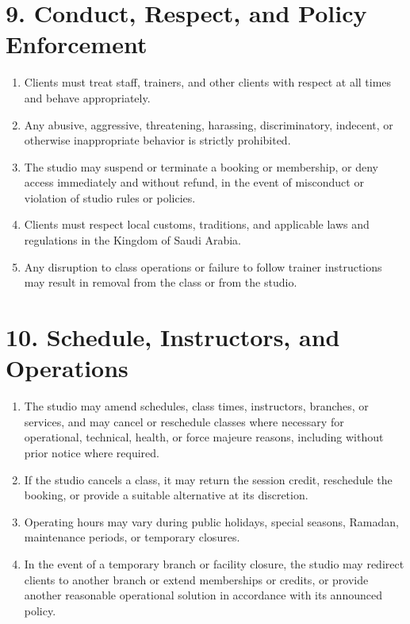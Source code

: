 \documentclass[12pt,a4paper]{article}
\begin{document}
\section*{9. Conduct, Respect, and Policy Enforcement}
\begin{enumerate}
    \item Clients must treat staff, trainers, and other clients with respect at all times and behave appropriately.
    \item Any abusive, aggressive, threatening, harassing, discriminatory, indecent, or otherwise inappropriate behavior is strictly prohibited.
    \item The studio may suspend or terminate a booking or membership, or deny access immediately and without refund, in the event of misconduct or violation of studio rules or policies.
    \item Clients must respect local customs, traditions, and applicable laws and regulations in the Kingdom of Saudi Arabia.
    \item Any disruption to class operations or failure to follow trainer instructions may result in removal from the class or from the studio.
\end{enumerate}

\section*{10. Schedule, Instructors, and Operations}
\begin{enumerate}
    \item The studio may amend schedules, class times, instructors, branches, or services, and may cancel or reschedule classes where necessary for operational, technical, health, or force majeure reasons, including without prior notice where required.
    \item If the studio cancels a class, it may return the session credit, reschedule the booking, or provide a suitable alternative at its discretion.
    \item Operating hours may vary during public holidays, special seasons, Ramadan, maintenance periods, or temporary closures.
    \item In the event of a temporary branch or facility closure, the studio may redirect clients to another branch or extend memberships or credits, or provide another reasonable operational solution in accordance with its announced policy.
\end{enumerate}
\end{document}
